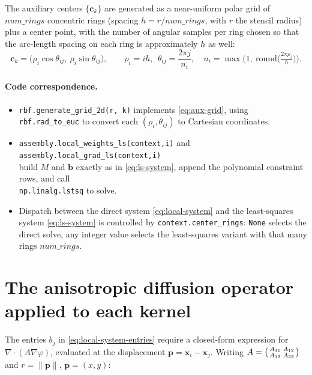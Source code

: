 \documentclass[11pt]{article}
\newcommand{\bp}{\mathbf{p}}
\newcommand{\bx}{\mathbf{x}}
\newcommand{\bc}{\mathbf{c}}
\newcommand{\diver}{\nabla\!\cdot}
\newcommand{\grad}{\nabla}
\begin{document}
The auxiliary centers $\{\bc_k\}$ are generated as a near-uniform
polar grid of $num\_rings$ concentric rings (spacing $h = r/num\_rings$, with $r$ the
stencil radius) plus a center point, with the number of angular
samples per ring chosen so that the arc-length spacing on each ring is
approximately $h$ as well:
\begin{equation}
  \bc_k = \big(\rho_i \cos\theta_{ij},\ \rho_i \sin\theta_{ij}\big),
  \qquad \rho_i = ih,\ \ \theta_{ij} = \frac{2\pi j}{n_i},
  \quad n_i = \max\!\Big(1,\ \mathrm{round}\big(\tfrac{2\pi\rho_i}{h}\big)\Big).
  \label{eq:aux-grid}
\end{equation}

\paragraph{Code correspondence.}
\begin{itemize}[leftmargin=2em]
  \item \texttt{rbf.generate\_grid\_2d(r, k)} implements
        \eqref{eq:aux-grid}, using \texttt{rbf.rad\_to\_euc} to convert
        each $(\rho_i, \theta_{ij})$ to Cartesian coordinates.
  \item \texttt{assembly.local\_weights\_ls(context,i)} and
        \texttt{assembly.local\_grad\_ls(context,i)} \\ build $M$ and
        $\mathbf{b}$ exactly as in \eqref{eq:ls-system}, append the
        polynomial constraint rows, and call \\
        \texttt{np.linalg.lstsq} to solve.
  \item Dispatch between the direct system \eqref{eq:local-system} and
        the least-squares system \eqref{eq:ls-system} is controlled by
        \texttt{context.center\_rings}: \texttt{None} selects the
        direct solve, any integer value selects the least-squares
        variant with that many rings $num\_rings$.
\end{itemize}

\section{The anisotropic diffusion operator applied to each kernel}
\label{sec:aniso-op}

The entries $b_j$ in \eqref{eq:local-system-entries} require a
closed-form expression for $\diver(A\grad\varphi)$, evaluated at the
displacement $\bp = \bx_i - \bx_j$. Writing $A = \begin{psmallmatrix}
A_{11} & A_{12} \\ A_{12} & A_{22} \end{psmallmatrix}$ and
$r = \|\bp\|$, $\bp = (x,y)$:
\end{document}
